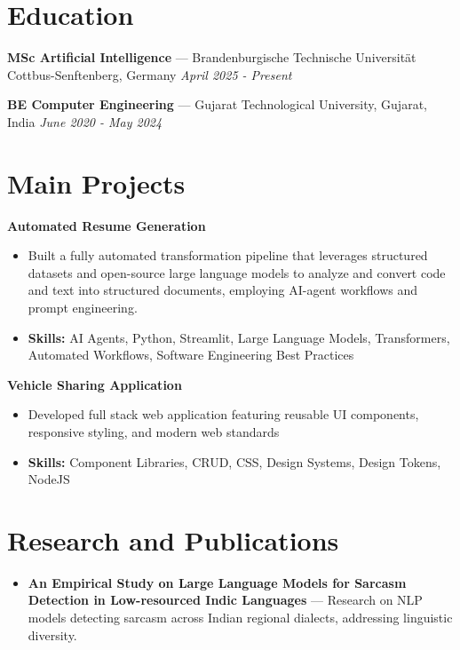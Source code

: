 \documentclass[a4paper,10pt]{article}
\begin{document}
\section*{Education}
\textbf{MSc Artificial Intelligence} — Brandenburgische Technische Universität Cottbus-Senftenberg, Germany \hfill \textit{April 2025 - Present}\par
\vspace{1.5pt}
\textbf{BE Computer Engineering} — Gujarat Technological University, Gujarat, India \hfill \textit{June 2020 - May 2024}\par

\section*{Main Projects}
\textbf{Automated Resume Generation}\par
\vspace{1pt}
\begin{itemize}
  \item Built a fully automated transformation pipeline that leverages structured datasets and open-source large language models to analyze and convert code and text into structured documents, employing AI-agent workflows and prompt engineering.
  \item \textbf{Skills:} AI Agents, Python, Streamlit, Large Language Models, Transformers, Automated Workflows, Software Engineering Best Practices
\end{itemize}
\vspace{3pt}
\textbf{Vehicle Sharing Application}\par
\vspace{1pt}
\begin{itemize}
  \item Developed full stack web application featuring reusable UI components, responsive styling, and modern web standards
  \item \textbf{Skills:} Component Libraries, CRUD, CSS, Design Systems, Design Tokens, NodeJS
\end{itemize}

\section*{Research and Publications}
\begin{itemize}
\item \textbf{An Empirical Study on Large Language Models for Sarcasm Detection in Low-resourced Indic Languages} — Research on NLP models detecting sarcasm across Indian regional dialects, addressing linguistic diversity.
\end{itemize}
\end{document}
